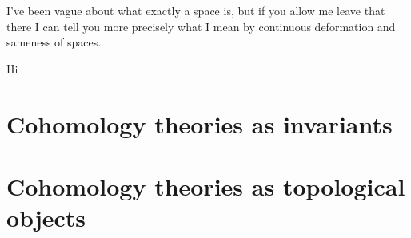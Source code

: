 \begin{nothing}[Homotopy]
  I've been vague about what exactly a space is, but if you allow me
  leave that there I can tell you more precisely what I mean by
  continuous deformation and sameness of spaces.
\end{nothing}

\begin{nothing}
  Hi
\end{nothing}

\begin{nothing}
  
\end{nothing}


\section{Cohomology theories as invariants}

\begin{nothing}
  
\end{nothing}


\section{Cohomology theories as topological objects}







